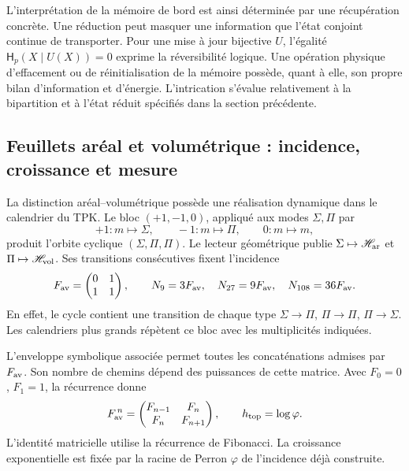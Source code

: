 L'interprétation de la mémoire de bord est ainsi déterminée par
une récupération concrète. Une réduction peut masquer une information
que l'état conjoint continue de transporter. Pour une mise à jour
bijective \(U\), l'égalité \(\mathsf H_p(X\mid U(X))=0\) exprime
la réversibilité logique. Une opération physique d'effacement ou de réinitialisation
de la mémoire possède, quant à elle, son propre bilan d'information et
d'énergie. L'intrication s'évalue relativement à la bipartition et à
l'état réduit spécifiés dans la section précédente.

\subsection{Feuillets aréal et volumétrique : incidence, croissance et mesure}
\label{ii:sec:ii-hojas-av}

La distinction aréal--volumétrique possède une réalisation dynamique dans le
calendrier du TPK. Le bloc \((+1,-1,0)\), appliqué aux modes
\(\Sigma,\Pi\) par
\[
 +1:m\mapsto\Sigma,\qquad -1:m\mapsto\Pi,\qquad 0:m\mapsto m,
\]
produit l'orbite cyclique \((\Sigma,\Pi,\Pi)\). Le lecteur géométrique
publie \(\Sigma\mapsto\mathscr H_{\rm ar}\) et
\(\Pi\mapsto\mathscr H_{\rm vol}\). Ses transitions consécutives
fixent l'incidence
\begin{equation}
 F_{\rm av}=\begin{pmatrix}0&1\\1&1\end{pmatrix},\qquad
 N_9=3F_{\rm av},\quad N_{27}=9F_{\rm av},\quad
 N_{108}=36F_{\rm av}.
 \label{ii:eq:ii-hojas-incidencia}
\end{equation}
En effet, le cycle contient une transition de chaque type
\(\Sigma\to\Pi\), \(\Pi\to\Pi\), \(\Pi\to\Sigma\).
Les calendriers plus grands répètent ce bloc avec les multiplicités
indiquées.

L'enveloppe symbolique associée permet toutes les concaténations
admises par \(F_{\rm av}\). Son nombre de chemins dépend des
puissances de cette matrice. Avec \(F_0=0\), \(F_1=1\), la récurrence donne
\begin{equation}
 F_{\rm av}^{\,n}=
 \begin{pmatrix}F_{n-1}&F_n\\F_n&F_{n+1}\end{pmatrix},
 \qquad h_{\rm top}=\log\varphi.
 \label{ii:eq:ii-hojas-fibonacci}
\end{equation}
L'identité matricielle utilise la récurrence de Fibonacci. La croissance
exponentielle est fixée par la racine de Perron \(\varphi\) de
l'incidence déjà construite.

